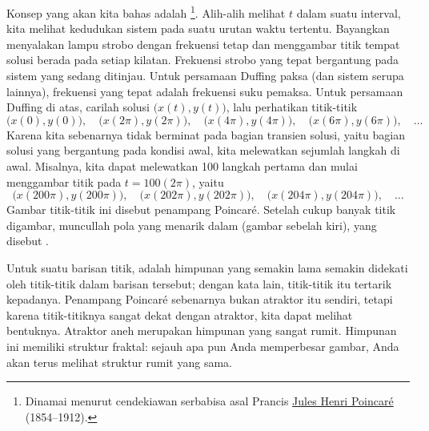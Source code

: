 Konsep yang akan kita bahas adalah \emph{}%
\footnote{Dinamai menurut cendekiawan serbabisa asal Prancis
\href{https://en.wikipedia.org/wiki/Henri_Poincar\%C3\%A9}{Jules Henri
Poincar\'e} (1854--1912).}.  Alih-alih melihat $t$ dalam suatu interval,
kita melihat kedudukan sistem pada suatu urutan waktu tertentu.  Bayangkan
menyalakan lampu strobo dengan frekuensi tetap dan menggambar titik tempat
solusi berada pada setiap kilatan.  Frekuensi strobo yang tepat bergantung
pada sistem yang sedang ditinjau.  Untuk persamaan Duffing paksa (dan
sistem serupa lainnya), frekuensi yang tepat adalah frekuensi suku pemaksa.
Untuk persamaan Duffing di atas, carilah solusi
$\bigl(x(t),y(t)\bigr)$, lalu perhatikan titik-titik
\begin{equation*}
\bigl(x(0),y(0)\bigr), \quad
\bigl(x(2\pi),y(2\pi)\bigr), \quad
\bigl(x(4\pi),y(4\pi)\bigr), \quad
\bigl(x(6\pi),y(6\pi)\bigr), \quad \ldots
\end{equation*}
Karena kita sebenarnya tidak berminat pada bagian transien solusi, yaitu
bagian solusi yang bergantung pada kondisi awal, kita melewatkan sejumlah
langkah di awal.  Misalnya, kita dapat melewatkan 100 langkah pertama dan
mulai menggambar titik pada $t = 100(2\pi)$, yaitu
\begin{equation*}
\bigl(x(200\pi),y(200\pi)\bigr), \quad
\bigl(x(202\pi),y(202\pi)\bigr), \quad
\bigl(x(204\pi),y(204\pi)\bigr), \quad \ldots
\end{equation*}
Gambar titik-titik ini disebut penampang Poincar\'e.  Setelah cukup banyak
titik digambar, muncullah pola yang menarik dalam
 (gambar sebelah kiri), yang disebut
\emph{}.

\begin{myfig}
\capstart
\caption{Atraktor aneh.  Grafik kiri tidak mengalami pergeseran fase,
sedangkan grafik kanan mengalami pergeseran fase
$\nicefrac{\pi}{4}$. \label{nlin:strange}}
\end{myfig}

Untuk suatu barisan titik, \emph{} adalah himpunan yang
semakin lama semakin didekati oleh titik-titik dalam barisan tersebut; dengan
kata lain, titik-titik itu tertarik kepadanya.  Penampang Poincar\'e sebenarnya
bukan atraktor itu sendiri, tetapi karena titik-titiknya sangat dekat dengan
atraktor, kita dapat melihat bentuknya.  Atraktor aneh merupakan himpunan yang
sangat rumit.  Himpunan ini memiliki struktur fraktal: sejauh apa pun Anda
memperbesar gambar, Anda akan terus melihat struktur rumit yang sama.

